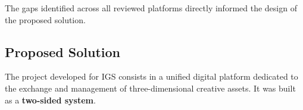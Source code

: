\begin{table}[H]
\centering
\caption{Comparison of existing 3D asset marketplace platforms}
\label{tab:platform_comparison}
\renewcommand{\arraystretch}{1.4}
\setlength{\tabcolsep}{5pt}
\end{table}

The gaps identified across all reviewed platforms directly informed the design of the proposed solution.

\subsection{Proposed Solution}

The project developed for IGS consists in a unified digital platform dedicated to the
exchange and management of three-dimensional creative assets. It was built as a
\textbf{two-sided system}.

